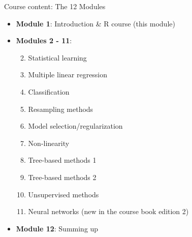 \documentclass[
  10pt,
  ignorenonframetext,
]{beamer}
\providecommand{\tightlist}{%
  \setlength{\itemsep}{0pt}\setlength{\parskip}{0pt}}
\begin{document}
\begin{frame}
\begin{block}{Course content: The 12 Modules}
\protect\hypertarget{course-content-the-12-modules}{}
\vspace{4mm}

\begin{itemize}
\tightlist
\item
  \textbf{Module 1}: Introduction \& R course (this module)
\end{itemize}

\vspace{2mm}

\begin{itemize}
\tightlist
\item
  \textbf{Modules 2 - 11}:

  \begin{enumerate}
  [1)]
  \setcounter{enumi}{1}
  \tightlist
  \item
    Statistical learning
  \item
    Multiple linear regression
  \item
    Classification
  \item
    Resampling methods
  \item
    Model selection/regularization
  \item
    Non-linearity
  \item
    Tree-based methods 1
  \item
    Tree-based methods 2
  \item
    Unsupervised methods
  \item
    Neural networks (new in the course book edition 2)
  \end{enumerate}
\end{itemize}

\vspace{2mm}

\begin{itemize}
\tightlist
\item
  \textbf{Module 12}: Summing up
\end{itemize}
\end{block}
\end{frame}
\end{document}
